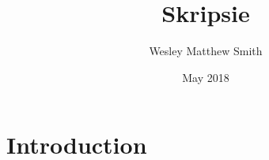 \documentclass{article}
\title{Skripsie}
\author{Wesley Matthew Smith}
\date{May 2018}
\begin{document}
\maketitle

\section{Introduction}
\end{document}
